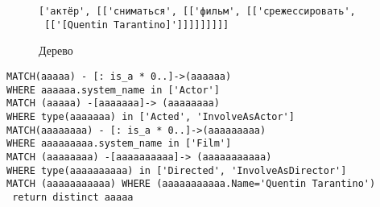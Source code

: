 \begin{figure}[!h]
\begin{tcolorbox}[colback=white, sharpish corners]
\begin{verbatim}
['актёр', [['сниматься', [['фильм', [['срежессировать',
 [['[Quentin Tarantino]']]]]]]]]]
\end{verbatim}
\end{tcolorbox}
\caption{Дерево}
\end{figure}
\begin{lstlisting}[caption={Результат}]
MATCH(aaaaa) - [: is_a * 0..]->(aaaaaa)
WHERE aaaaaa.system_name in ['Actor']
MATCH (aaaaa) -[aaaaaaa]-> (aaaaaaaa) 
WHERE type(aaaaaaa) in ['Acted', 'InvolveAsActor']
MATCH(aaaaaaaa) - [: is_a * 0..]->(aaaaaaaaa)
WHERE aaaaaaaaa.system_name in ['Film']
MATCH (aaaaaaaa) -[aaaaaaaaaa]-> (aaaaaaaaaaa) 
WHERE type(aaaaaaaaaa) in ['Directed', 'InvolveAsDirector']
MATCH (aaaaaaaaaaa) WHERE (aaaaaaaaaaa.Name='Quentin Tarantino')
 return distinct aaaaa
\end{lstlisting}

